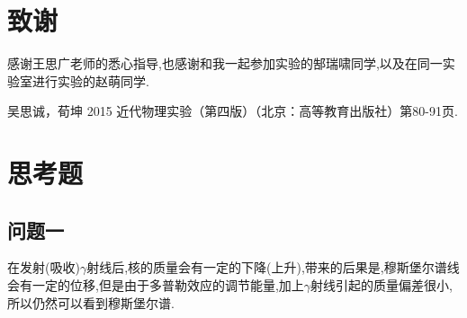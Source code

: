 \documentclass[aps,pre,12pt,preprint,onecolumn,showpacs,showkeys]{revtex4-1}
\begin{document}
\section{致谢}
感谢王思广老师的悉心指导,也感谢和我一起参加实验的郜瑞啸同学,以及在同一实验室进行实验的赵萌同学.
%
\begin{thebibliography}{}
 吴思诚，荀坤 2015 近代物理实验（第四版）（北京：高等教育出版社）第80-91页.

\end{thebibliography}

\clearpage
\appendix
\section{思考题}
\subsection{问题一}
在发射(吸收)$\gamma$射线后,核的质量会有一定的下降(上升),带来的后果是,穆斯堡尔谱线会有一定的位移,但是由于多普勒效应的调节能量,加上$\gamma$射线引起的质量偏差很小,所以仍然可以看到穆斯堡尔谱.
\end{document}
